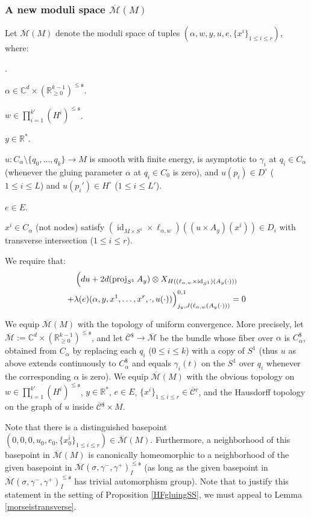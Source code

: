 \documentclass[12pt]{article}
\theoremstyle{definition}
\theoremstyle{remark}
\numberwithin{equation}{subsection}
\newcommand{\s}{\mathfrak s}
\newcommand{\CC}{\mathbb C}
\newcommand{\RR}{\mathbb R}
\newcommand{\proj}{\operatorname{proj}}
\newcommand{\Mbar}{\overline{\mathcal M}}
\newcommand{\Cbar}{\overline{\mathcal C}}
\newcommand{\id}{\operatorname{id}}
\newcounter{rcounti}
\newenvironment{rlist}{\begin{list}{\roman{rcounti}.}{\usecounter{rcounti}
\setlength\itemsep{0pt}
\setlength\labelsep{4pt}
\setlength\labelwidth{16pt}
\setlength\leftmargin{32pt}
\setlength\listparindent{0pt}
\setlength\parsep{0pt}
\setlength\parskip{0pt}
\setlength\partopsep{0pt}
\setlength\rightmargin{0pt}
\setlength\topsep{0pt}
\setlength\itemindent{0pt}
}}{\end{list}}
\begin{document}
\subsubsection{A new moduli space $\Mbar(M)$}

Let $\Mbar(M)$ denote the moduli space of tuples $(\alpha,w,y,u,e,\{x^i\}_{1\leq i\leq r})$, where:
\begin{rlist}
\item$\alpha\in\CC^d\times(\RR_{\geq 0}^{k-1})^{\leq\s}$.
\item$w\in\prod_{i=1}^{k\prime}(H^i)^{\leq\s}$.
\item$y\in\RR^\ast$.
\item$u:C_\alpha\setminus\{q_0,\ldots,q_k\}\to M$ is smooth with finite energy, is asymptotic to $\gamma_i$ at $q_i\in C_\alpha$ (whenever the gluing parameter $\alpha$ at $q_i\in C_0$ is zero), and $u(p_i)\in D^\circ$ ($1\leq i\leq L$) and $u(p_i')\in H^\circ$ ($1\leq i\leq L'$).
\item$e\in E$.
\item$x^i\in C_\alpha$ (not nodes) satisfy $(\id_{M\times S^1}\times\ell_{\alpha,w})((u\times A_y)(x^i))\in D_i$ with transverse intersection ($1\leq i\leq r$).
\item We require that:
\begin{multline}\label{finalHFdelbareqn}
\Bigl(du+2d(\proj_{S^1}A_y)\otimes X_{H((\ell_{\alpha,w}\times\id_{S^1})(A_y(\cdot)))}\\
+\lambda(e)(\alpha,y,x^1,\ldots,x^r,\cdot,u(\cdot))\Bigr)^{0,1}_{j_y,J(\ell_{\alpha,w}(A_y(\cdot)))}=0
\end{multline}
\end{rlist}
We equip $\Mbar(M)$ with the topology of uniform convergence.  More precisely, let $\Mbar:=\CC^d\times(\RR_{\geq 0}^{k-1})^{\leq\s}$, and let $\Cbar{}^\$\to\Mbar$ be the bundle whose fiber over $\alpha$ is $C_\alpha^\$$, obtained from $C_\alpha$ by replacing each $q_i$ ($0\leq i\leq k$) with a copy of $S^1$ (thus $u$ as above extends continuously to $C_\alpha^\$$ and equals $\gamma_i(t)$ on the $S^1$ over $q_i$ whenever the corresponding $\alpha$ is zero).  We equip $\Mbar(M)$ with the obvious topology on $w\in\prod_{i=1}^{k\prime}(H^i)^{\leq\s}$, $y\in\RR^\ast$, $e\in E$, $\{x^i\}_{1\leq i\leq r}\in\Cbar{}^r$, and the Hausdorff topology on the graph of $u$ inside $\Cbar{}^\$\times M$.

Note that there is a distinguished basepoint $(0,0,0,u_0,e_0,\{x_0^i\}_{1\leq i\leq r})\in\Mbar(M)$.  Furthermore, a neighborhood of this basepoint in $\Mbar(M)$ is canonically homeomorphic to a neighborhood of the given basepoint in $\Mbar(\sigma,\gamma^-,\gamma^+)_I^{\leq\s}$ (as long as the given basepoint in $\Mbar(\sigma,\gamma^-,\gamma^+)_I^{\leq\s}$ has trivial automorphism group).  Note that to justify this statement in the setting of Proposition \ref{HFgluingSS}, we must appeal to Lemma \ref{morseistransverse}.
\end{document}
